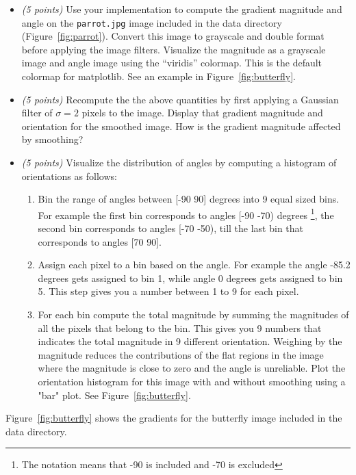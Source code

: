 \documentclass[10pt,letterpaper]{article}
\newcommand{\cmd}[1] {{\color{blue}\texttt{#1}}}
\begin{document}
\begin{itemize}
\item \emph{(5 points)} Use your implementation to compute the
  gradient magnitude and
  angle on the \cmd{parrot.jpg} image included in the data directory (Figure~\ref{fig:parrot}). 
  Convert this image to grayscale and double format before
  applying the image filters.
  Visualize the magnitude as a grayscale
  image and angle image using the ``viridis'' colormap. This is the
  default colormap for matplotlib. See an example in
  Figure~\ref{fig:butterfly}.
\item \emph{(5 points)}
  Recompute the the above quantities by first applying a Gaussian
  filter of
  $\sigma=2$ pixels to the image.
  Display that gradient magnitude and orientation for the smoothed
  image. How is the gradient magnitude affected by smoothing?
\item \emph{(5 points)}
  Visualize the distribution of angles by computing a
  histogram of orientations as follows:
  \begin{enumerate}
    \item Bin the range of
      angles between [-90 90] degrees into 9 equal sized bins. 
  For example the first bin corresponds to angles [-90 -70) degrees
    \footnote{The notation means that -90 is included and -70 is excluded}, the
    second bin corresponds to angles [-70 -50), till 
    the last bin that corresponds to angles [70 90]. 
    \item Assign each pixel to a bin based on the angle. For example
      the angle -85.2 degrees gets assigned to bin 1, while angle 0 degrees gets
      assigned to bin 5. This step gives you a number between 1 to 9 for each pixel.
    \item For each bin compute the total magnitude by summing the magnitudes of
      all the pixels that belong to the bin. This gives you
      9 numbers that indicates the total magnitude in 9 different orientation. Weighing by the magnitude reduces the contributions of the flat regions in the image where the magnitude is close to zero and the angle is unreliable.
	  Plot the orientation histogram for this image with and without
  smoothing using a "bar" plot. See Figure~\ref{fig:butterfly}.

  \end{enumerate}
\end{itemize}

Figure~\ref{fig:butterfly} shows the gradients for the
butterfly image included in the data directory.
\end{document}
